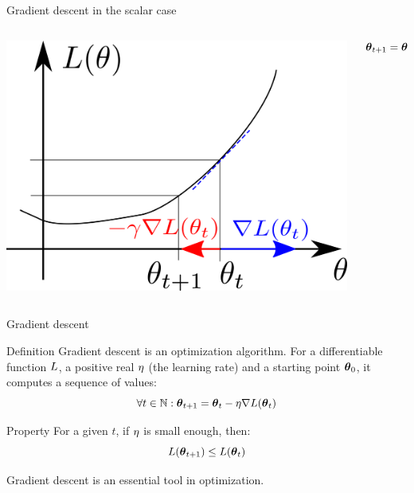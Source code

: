 \documentclass[xcolor=pdftex,dvipsnames,table,mathserif]{beamer}
\begin{document}
\begin{frame}{Gradient descent in the scalar case}

  \begin{columns}
    \begin{column}{.5\textwidth}
      \includegraphics[width=\textwidth]{gradient_descent}
    \end{column}

    \begin{column}{.5\textwidth}
      \[
      \boldsymbol{\theta}_{t+1} = \boldsymbol{\theta}_t - \eta\nabla L(\boldsymbol{\theta}_t)
      \]
    \end{column}
  \end{columns}

\end{frame}


\begin{frame}{Gradient descent}

  \begin{block}{Definition}
    Gradient descent is an optimization algorithm. For a differentiable function $L$, a positive real $\eta$ (the \alert{learning rate}) and a starting point $\boldsymbol{\theta}_0$, it computes a sequence of values:
    \[
    \forall t \in \mathbb{N}: \boldsymbol{\theta}_{t+1} = \boldsymbol{\theta}_t - \eta \nabla L(\boldsymbol{\theta}_t)
    \]
  \end{block}

  \begin{block}{Property}
    For a given $t$, if $\eta$ is small enough, then:
    \[
    L(\boldsymbol{\theta}_{t+1}) \leq L(\boldsymbol{\theta}_t)
    \]
  \end{block}

  Gradient descent is an essential tool in optimization.

\end{frame}
\end{document}
